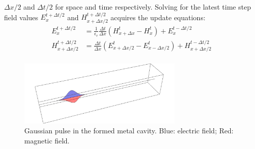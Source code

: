 \documentclass[12pt,a4paper]{article}
\begin{document}
		\(\Delta x/2\) and \(\Delta t / 2\) for space and time respectively.
		Solving for the latest time step field values \(E_x^{t+\Delta t/2}\) and
		\(H_{x+\Delta x/2}^{t+\Delta t/2}\) acquires the update equations:
		\begin{align}
			E_x^{t+\Delta t/2}&=\frac{1}{\epsilon_r}\frac{\Delta t}{\Delta x}\left(H_{x+\Delta x}^t-H_{x}^t\right)+E_x^{t-\Delta t/2}\\
			H_{x+\Delta x/2}^{t+\Delta t/2}&=\frac{\Delta t}{\Delta x}\left(E_{x+\Delta x/2}^t-E_{x-\Delta x/2}^t\right)+H_{x+\Delta x/2}^{t-\Delta t/2}\\
		\end{align}
		\begin{figure}[H]
			\centering
			\includegraphics[width=0.7\textwidth]{A2/data/A2b_Start.png}
			\caption[]{Gaussian pulse in the formed metal cavity. Blue: electric field; Red: magnetic field.}
		\end{figure}
	
\end{document}
